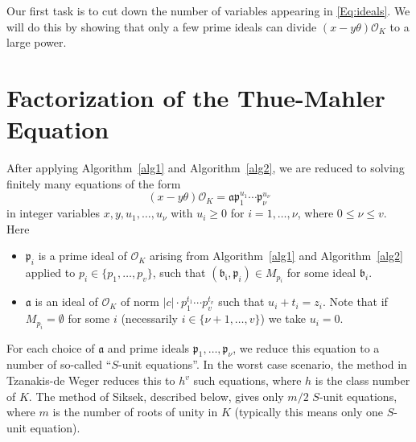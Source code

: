 Our first task is to cut down the number of variables appearing in \eqref{Eq:ideals}. We will do this by showing that only a few prime ideals can divide $(x-y\theta)\mathcal{O}_K$ to a large power. 

\section{Factorization of the Thue-Mahler Equation}

After applying Algorithm~\ref{alg1} and Algorithm~\ref{alg2}, we are reduced to solving finitely many equations of the form
\begin{equation}\label{Eq:TMfactored}
(x-y\theta)\mathcal{O}_K=\mathfrak{a} \mathfrak{p}_1^{u_1}\cdots \mathfrak{p}_{\nu}^{u_{\nu}}
\end{equation}
in integer variables $x,y,u_1, \dots, u_{\nu}$ with $u_i \geq 0$ for $i = 1, \dots, \nu$, where $0 \leq \nu \leq v$. Here
\begin{itemize}
\item $\mathfrak{p}_i$ is a prime ideal of $\mathcal{O}_K$ arising from Algorithm~\ref{alg1} and Algorithm~\ref{alg2} applied to $p_i \in \{p_1, \dots, p_v\}$, such that $(\mathfrak{b_i}, \mathfrak{p}_i) \in M_{p_i}$ for some ideal $\mathfrak{b}_i$. 
\item $\mathfrak{a}$ is an ideal of $\mathcal{O}_K$ of norm $|c|\cdot p_1^{t_1} \cdots p_v^{t_v}$ such that
$u_i + t_i =  z_i$. Note that if $M_{p_i} = \emptyset$ for some $i$ (necessarily $i \in \{{\nu} + 1, \dots, v\}$) we take $u_i = 0$. 
\end{itemize}

For each choice of $\mathfrak{a}$ and prime ideals $\mathfrak{p}_1, \dots, \mathfrak{p}_{\nu}$, we reduce this equation to a number of so-called ``$S$-unit equations''. In the worst case scenario, the method in Tzanakis-de Weger reduces this to $h^v$ such equations, where $h$ is the class number of $K$. The method of Siksek, described below, gives only $m/2$ $S$-unit equations, where $m$ is the number of roots of unity in $K$ (typically this means only one $S$-unit equation). 

